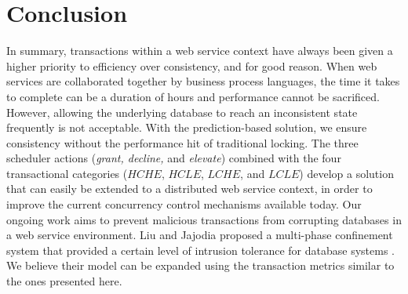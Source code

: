 \section*{Conclusion}
In summary, transactions within a web service context have always been given a higher priority to efficiency over consistency, and for good reason. When web services are collaborated together by business process languages, the time it takes to complete can be a duration of hours and performance cannot be sacrificed. However, allowing the underlying database to reach an inconsistent state frequently is not acceptable. With the prediction-based solution, we ensure consistency without the performance hit of traditional locking. The three scheduler actions (\textit{grant, decline,} and \textit{elevate}) combined with the four transactional categories ($HCHE$, $HCLE$, $LCHE$, and $LCLE$) develop a solution that can easily be extended to a distributed web service context, in order to improve the current concurrency control mechanisms available today. Our ongoing work aims to prevent malicious transactions from corrupting databases in a web service environment. Liu and Jajodia proposed a multi-phase confinement system that provided a certain level of intrusion tolerance for database systems \cite{Liu_Intrusion}. We believe their model can be expanded using the transaction metrics similar to the ones presented here. 

